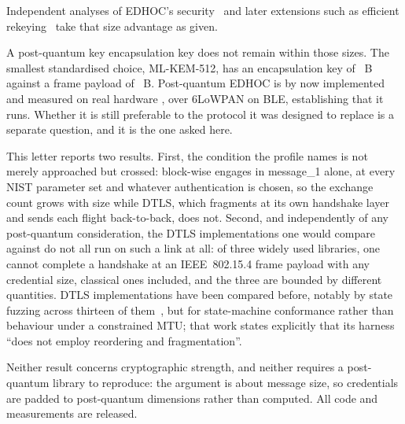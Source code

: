 Independent analyses of EDHOC's security~\cite{perez2024} and later extensions such as
efficient rekeying~\cite{lopezgomez2026} take that size advantage as given.

A post-quantum key encapsulation key does not remain within those sizes. The smallest
standardised choice, ML-KEM-512, has an encapsulation key of \numKemFiveOneTwo~B against a
frame payload of \numFramePayload~B. Post-quantum EDHOC is by now implemented and measured on
real hardware \cite{fraile2025}, over 6LoWPAN on BLE, establishing that it runs. Whether it is
still preferable to the protocol it was designed to replace is a separate question, and it is
the one asked here.

This letter reports two results. First, the condition the profile names is not merely
approached but crossed: block-wise engages in message\_1 alone, at every NIST parameter set
and whatever authentication is chosen, so the exchange count grows with size while DTLS, which
fragments at its own handshake layer and sends each flight back-to-back, does not. Second, and
independently of any post-quantum consideration, the DTLS implementations one would compare
against do not all run on such a link at all: of three widely used libraries, one cannot
complete a handshake at an IEEE~802.15.4 frame payload with any credential size, classical
ones included, and the three are bounded by different quantities. DTLS implementations have
been compared before, notably by state fuzzing across thirteen of
them~\cite{fiterau2020}, but for state-machine conformance rather than behaviour under a
constrained MTU; that work states explicitly that its harness ``does not employ reordering and
fragmentation''.

Neither result concerns cryptographic strength, and neither requires a post-quantum library to
reproduce: the argument is about message size, so credentials are padded to post-quantum
dimensions rather than computed. All code and measurements are released.
